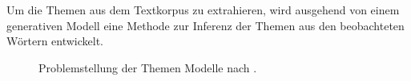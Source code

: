 Um die Themen aus dem Textkorpus zu extrahieren, wird ausgehend von einem generativen Modell eine Methode zur Inferenz der Themen aus den beobachteten Wörtern entwickelt. 
\begin{figure}[ht]
  \centering
\caption{Problemstellung der Themen Modelle nach \citep{Steyvers2006}.}
\end{figure}

